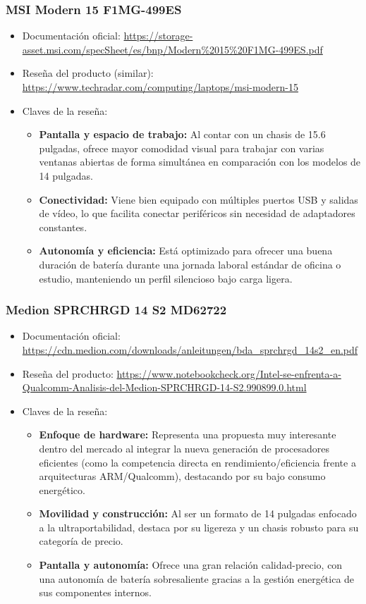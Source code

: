 \documentclass[11.5pt]{article}
\begin{document}
	\subsubsection*{MSI Modern 15 F1MG-499ES}
	\begin{itemize}
		\item Documentación oficial: \url{https://storage-asset.msi.com/specSheet/es/bnp/Modern\%2015\%20F1MG-499ES.pdf}
		\item Reseña del producto (similar): \url{https://www.techradar.com/computing/laptops/msi-modern-15}
		\item Claves de la reseña:
		\begin{itemize}[label=$\bullet$]
			\item \textbf{Pantalla y espacio de trabajo:} Al contar con un chasis de 15.6 pulgadas, ofrece mayor comodidad visual para trabajar con varias ventanas abiertas de forma simultánea en comparación con los modelos de 14 pulgadas.
			\item \textbf{Conectividad:} Viene bien equipado con múltiples puertos USB y salidas de vídeo, lo que facilita conectar periféricos sin necesidad de adaptadores constantes.
			\item \textbf{Autonomía y eficiencia:} Está optimizado para ofrecer una buena duración de batería durante una jornada laboral estándar de oficina o estudio, manteniendo un perfil silencioso bajo carga ligera.
		\end{itemize}
	\end{itemize}
	
	\subsubsection*{Medion SPRCHRGD 14 S2 MD62722}
	\begin{itemize}
		\item Documentación oficial: \url{https://cdn.medion.com/downloads/anleitungen/bda_sprchrgd_14s2_en.pdf}
		\item Reseña del producto: \url{https://www.notebookcheck.org/Intel-se-enfrenta-a-Qualcomm-Analisis-del-Medion-SPRCHRGD-14-S2.990899.0.html}
		\item Claves de la reseña:
		\begin{itemize}[label=$\bullet$]
			\item \textbf{Enfoque de hardware:} Representa una propuesta muy interesante dentro del mercado al integrar la nueva generación de procesadores eficientes (como la competencia directa en rendimiento/eficiencia frente a arquitecturas ARM/Qualcomm), destacando por su bajo consumo energético.
			\item \textbf{Movilidad y construcción:} Al ser un formato de 14 pulgadas enfocado a la ultraportabilidad, destaca por su ligereza y un chasis robusto para su categoría de precio.
			\item \textbf{Pantalla y autonomía:} Ofrece una gran relación calidad-precio, con una autonomía de batería sobresaliente gracias a la gestión energética de sus componentes internos.
		\end{itemize}
	\end{itemize}
	
\end{document}
